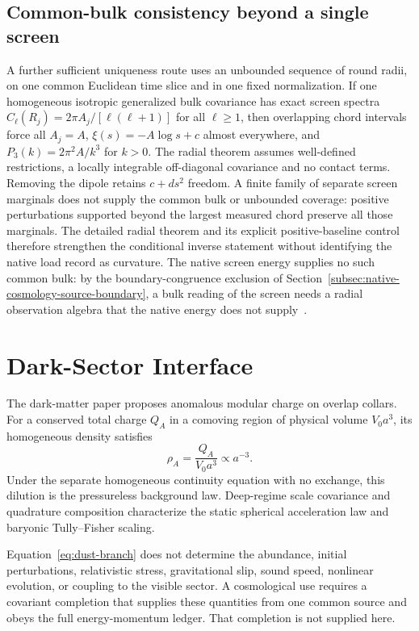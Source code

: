 \documentclass[11pt]{article}
\theoremstyle{remark}
\begin{document}
\subsection{Common-bulk consistency beyond a single screen}
A further sufficient uniqueness route uses an unbounded sequence of round
radii, on one common Euclidean time slice and in one fixed normalization.
If one homogeneous isotropic generalized bulk covariance has exact screen
spectra \(C_\ell(R_j)=2\pi A_j/[\ell(\ell+1)]\) for all \(\ell\ge1\),
then overlapping chord intervals force all \(A_j=A\),
\(\xi(s)=-A\log s+c\) almost everywhere, and
\(P_3(k)=2\pi^2A/k^3\) for \(k>0\).
The radial theorem assumes well-defined restrictions, a locally integrable
off-diagonal covariance and no contact terms. Removing the dipole retains
\(c+ds^2\) freedom. A finite family of separate screen marginals does
not supply the common bulk or unbounded coverage: positive perturbations
supported beyond the largest measured chord preserve all those marginals.
The detailed radial theorem and its explicit positive-baseline control
therefore strengthen the conditional inverse statement without identifying
the native load record as curvature. The native screen energy supplies no
such common bulk: by the boundary-congruence exclusion of
Section~\ref{subsec:native-cosmology-source-boundary}, a bulk reading of the
screen needs a radial observation algebra that the native energy does not
supply~\cite{ophcontinuum}.

\section{Dark-Sector Interface}

The dark-matter paper proposes anomalous modular charge on overlap collars.
For a conserved total charge \(Q_A\) in a comoving region of physical volume
\(V_0a^3\), its homogeneous density satisfies
\begin{equation}
\rho_A=\frac{Q_A}{V_0a^3}\propto a^{-3}.
\label{eq:dust-branch}
\end{equation}
Under the separate homogeneous continuity equation with no exchange, this
dilution is the pressureless background law. Deep-regime scale covariance
and quadrature composition characterize the static spherical acceleration
law and baryonic Tully--Fisher scaling.

Equation~\eqref{eq:dust-branch} does not determine the abundance, initial
perturbations, relativistic stress, gravitational slip, sound speed, nonlinear
evolution, or coupling to the visible sector. A cosmological use requires a
covariant completion that supplies these quantities from one common source and
obeys the full energy-momentum ledger. That completion is not supplied here.
\end{document}
